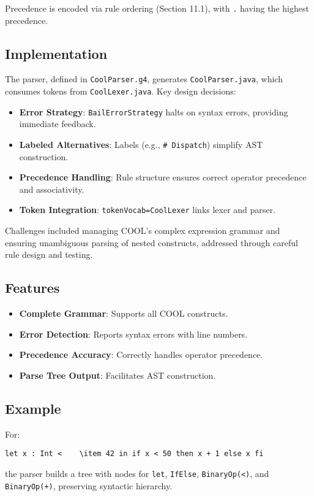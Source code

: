 \documentclass[11pt, titlepage]{article}
\begin{document}
Precedence is encoded via rule ordering (Section 11.1), with \texttt{.} having the highest precedence.

\subsection{Implementation}
The parser, defined in \texttt{CoolParser.g4}, generates \texttt{CoolParser.java}, which consumes tokens from \texttt{CoolLexer.java}. Key design decisions:
\begin{itemize}[leftmargin=*]
    \item \textbf{Error Strategy}: \texttt{BailErrorStrategy} halts on syntax errors, providing immediate feedback.
    \item \textbf{Labeled Alternatives}: Labels (e.g., \texttt{\# Dispatch}) simplify AST construction.
    \item \textbf{Precedence Handling}: Rule structure ensures correct operator precedence and associativity.
    \item \textbf{Token Integration}: \texttt{tokenVocab=CoolLexer} links lexer and parser.
\end{itemize}

Challenges included managing COOL's complex expression grammar and ensuring unambiguous parsing of nested constructs, addressed through careful rule design and testing.

\subsection{Features}
\begin{itemize}[leftmargin=*]
    \item \textbf{Complete Grammar}: Supports all COOL constructs.
    \item \textbf{Error Detection}: Reports syntax errors with line numbers.
    \item \textbf{Precedence Accuracy}: Correctly handles operator precedence.
    \item \textbf{Parse Tree Output}: Facilitates AST construction.
\end{itemize}

\subsection{Example}
For:
\begin{lstlisting}
let x : Int <    \item 42 in if x < 50 then x + 1 else x fi
\end{lstlisting}
the parser builds a tree with nodes for \texttt{let}, \texttt{IfElse}, \texttt{BinaryOp(<)}, and \texttt{BinaryOp(+)}, preserving syntactic hierarchy.
\end{document}
